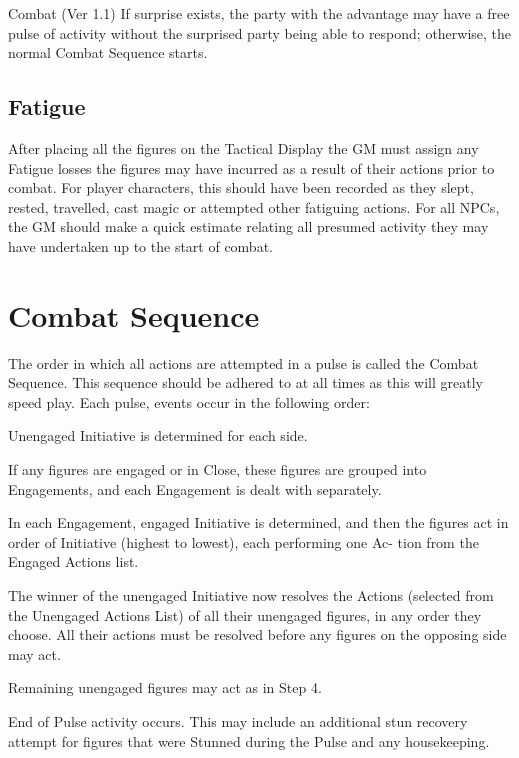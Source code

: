 \begin{Chapter}{Combat (Ver 1.1)}
If surprise exists, the party with the advantage may have a free pulse
of activity without the surprised party being able to respond;
otherwise, the normal Combat Sequence starts.

\subsection{Fatigue}

After placing all the figures on the Tactical Display the GM must
assign any Fatigue losses the figures may have incurred as a result of
their actions prior to combat.  For player characters, this should
have been recorded as they slept, rested, travelled, cast magic or
attempted other fatiguing actions. For all NPCs, the GM should make a
quick estimate relating all presumed activity they may have undertaken
up to the start of combat.

\section{Combat Sequence}

The order in which all actions are attempted in a pulse is called the
Combat Sequence.  This sequence should be adhered to at all times as
this will greatly speed play. Each pulse, events occur in the
following order:

\begin{Enumerate}
\item Unengaged Initiative is determined for each side.

\item If any figures are engaged or in Close, these figures are
  grouped into Engagements, and each Engagement is dealt with
  separately.

\item In each Engagement, engaged Initiative is determined, and then
  the figures act in order of Initiative (highest to lowest), each
  performing one Ac- tion from the Engaged Actions list.

\item The winner of the unengaged Initiative now resolves the Actions
  (selected from the Unengaged Actions List) of all their unengaged
  figures, in any order they choose.  All their actions must be
  resolved before any figures on the opposing side may act.

\item Remaining unengaged figures may act as in Step 4.

\item End of Pulse activity occurs.  This may include an additional
  stun recovery attempt for figures that were Stunned during the Pulse
  and any housekeeping.


\end{Enumerate}
\end{Chapter}
